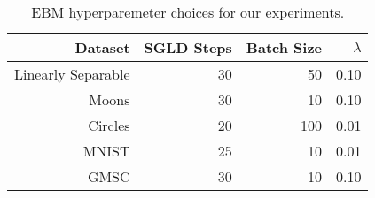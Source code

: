 \begin{table}

\caption{EBM hyperparemeter choices for our experiments. \label{tab:ebmparams} \newline}
\centering
\fontsize{8}{10}\selectfont
\begin{tabular}[t]{rrrr}
\toprule
Dataset & SGLD Steps & Batch Size & $\lambda$\\
\midrule
Linearly Separable & 30 & 50 & 0.10\\
Moons & 30 & 10 & 0.10\\
Circles & 20 & 100 & 0.01\\
MNIST & 25 & 10 & 0.01\\
GMSC & 30 & 10 & 0.10\\
\bottomrule
\end{tabular}
\end{table}
